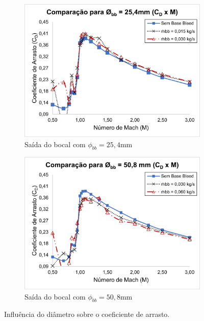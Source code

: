 \begin{figure}[!ht]
	\centering
	\begin{subfigure}[b]{0.47\textwidth}
    	\centering
    	\includegraphics[width=\textwidth]{cd-combasebleed-diametro-1pol.png}
    	\caption{Saída do bocal com $\phi_{bb} = 25,4 \unit{\mm}$}
    	\label{fig:comparacao-bb-diametro-1pol}
    \end{subfigure}
    \hfill
	\begin{subfigure}[b]{0.47\textwidth}
    	\centering
    	\includegraphics[width=\textwidth]{cd-combasebleed-diametro-2pol.png}
    	\caption{Saída do bocal com $\phi_{bb} = 50,8 \unit{\mm}$}
    	\label{fig:comparacao-bb-diametro-2pol}
    \end{subfigure}
	\caption{Influência do diâmetro sobre o coeficiente de arrasto.}
	\label{fig:comparacao-bb-diametro-vazoes}
\end{figure}

